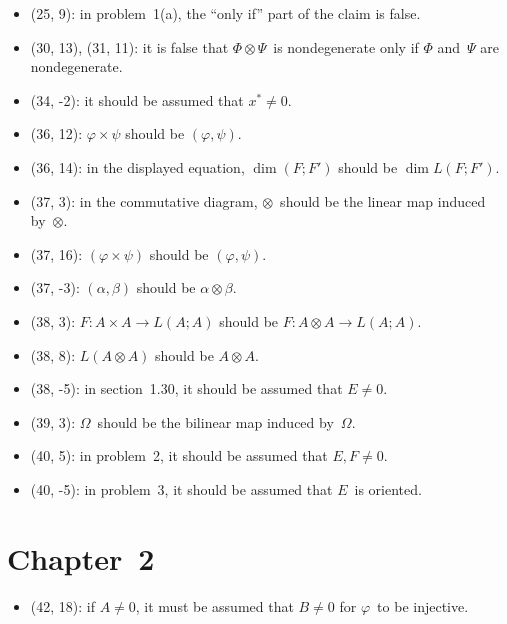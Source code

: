 \documentclass[letterpaper,12pt]{article}
\newcommand{\tprod}{\otimes}
\begin{document}
\begin{itemize}
\item (25, 9): in problem~1(a), the ``only if'' part of the claim is false.
\item (30, 13), (31, 11): it is false that \(\Phi\tprod\Psi\)~is nondegenerate only if \(\Phi\) and~\(\Psi\) are nondegenerate.
\item (34, -2): it should be assumed that \(x^*\ne 0\).
\item (36, 12): \(\varphi\times\psi\) should be \((\varphi,\psi)\).
\item (36, 14): in the displayed equation, \(\dim(F;F')\) should be \(\dim L(F;F')\).
\item (37, 3): in the commutative diagram, \(\tprod\)~should be the linear map induced by~\(\tprod\).
\item (37, 16): \((\varphi\times\psi)\) should be \((\varphi,\psi)\).
\item (37, -3): \((\alpha,\beta)\) should be \(\alpha\tprod\beta\).
\item (38, 3): \(F:A\times A\to L(A;A)\) should be \(F:A\tprod A\to L(A;A)\).
\item (38, 8): \(L(A\tprod A)\) should be \(A\tprod A\).
\item (38, -5): in section~1.30, it should be assumed that \(E\ne 0\).
\item (39, 3): \(\Omega\)~should be the bilinear map induced by~\(\Omega\).
\item (40, 5): in problem~2, it should be assumed that \(E,F\ne 0\).
\item (40, -5): in problem~3, it should be assumed that \(E\)~is oriented.
\end{itemize}

\section*{Chapter~2}
\begin{itemize}
\item (42, 18): if \(A\ne 0\), it must be assumed that \(B\ne 0\) for \(\varphi\)~to be injective.
\end{itemize}
\end{document}

